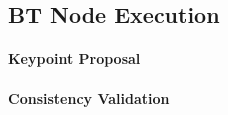 \documentclass{article}
\begin{document}



\subsection{BT Node Execution}


\paragraph{Keypoint Proposal}





\paragraph{Consistency Validation}



\end{document}
